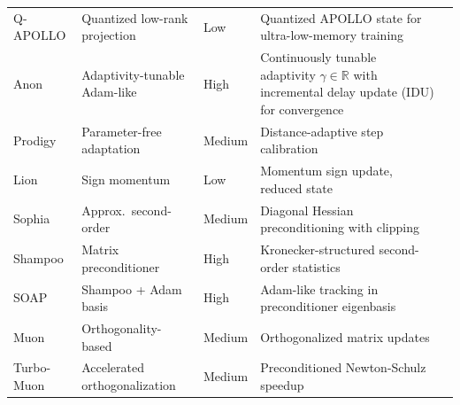 \begin{longtable}{p{2.2cm}p{2.8cm}p{2.0cm}p{5.4cm}p{1.8cm}}
Q-APOLLO & Quantized low-rank projection & Low & Quantized APOLLO state for ultra-low-memory training & \citep{zhu2025apollosgdlikememoryadamwlevel} \\
Anon & Adaptivity-tunable Adam-like & High & Continuously tunable adaptivity $\gamma \in \mathbb{R}$ with incremental delay update (IDU) for convergence & \citep{anon2026anon} \\
Prodigy & Parameter-free adaptation & Medium & Distance-adaptive step calibration & \citep{mishchenko_prodigy_2023} \\
Lion & Sign momentum & Low & Momentum sign update, reduced state & \citep{chen_symbolic_2023} \\
Sophia & Approx.\ second-order & Medium & Diagonal Hessian preconditioning with clipping & \citep{liu_sophia_2023} \\
Shampoo & Matrix preconditioner & High & Kronecker-structured second-order statistics & \citep{gupta_shampoo_2018} \\
SOAP & Shampoo + Adam basis & High & Adam-like tracking in preconditioner eigenbasis & \citep{vyas_soap_2024} \\
Muon & Orthogonality-based & Medium & Orthogonalized matrix updates & \citep{shen_convergence_2025} \\
Turbo-Muon & Accelerated orthogonalization & Medium & Preconditioned Newton-Schulz speedup & \citep{boissin_turbo-muon_2025} \\
\bottomrule
\end{longtable}
\normalsize

